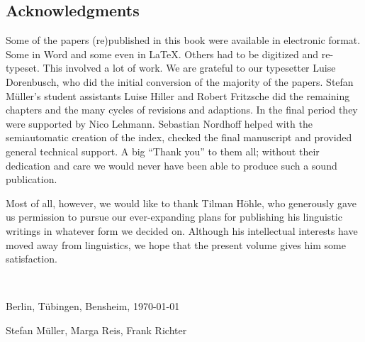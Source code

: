 \begin{refsection}
\section*{Acknowledgments}

Some of the papers (re)published in this book were available in electronic format. Some in Word and
some even in \LaTeX. Others had to be digitized and re-typeset. This involved a lot of work. We are
grateful to our typesetter Luise Dorenbusch, who did the initial conversion of the majority of the
papers. Stefan Müller's student assistants Luise Hiller and Robert Fritzsche did the remaining
chapters and the many cycles of revisions and adaptions. In the final period they were supported by
Nico Lehmann. Sebastian Nordhoff helped with the semiautomatic creation of the index, checked the
final manuscript and provided general technical support. A big ``Thank you'' to them all; without their dedication and
care we would never have been able to produce such a sound publication.


Most of all, however, we would like to thank Tilman Höhle, who generously gave us permission to pursue our ever-expanding plans for publishing his linguistic writings in whatever form we decided on. Although his intellectual interests have moved away from linguistics, we hope that the present volume gives him some satisfaction.

~\medskip

\noindent
Berlin, Tübingen, Bensheim, \today

\hfill Stefan Müller, Marga Reis, Frank Richter


\nocite{g_Hoehle78b,g_Hoehle79,Hoehle80,Hoehle83,Hoehle86,Hoehle91,Hoehle91b,hoehle:94c,hoehle1994a-eng,hoehle94b-eng,hoehle:95,g_Hoehle96a,Hoehle97a,Hoehle99a,Hoehle06}

\label{page-hoehle-refs}
\printbibliography[heading=subbibliography,notkeyword=this]

\end{refsection}




